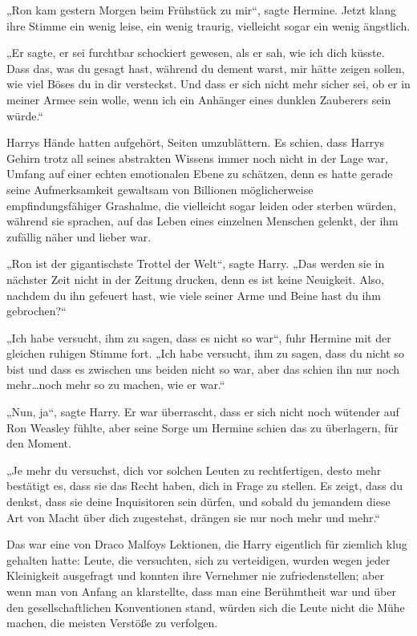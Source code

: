 {„Ron kam gestern Morgen beim Frühstück zu mir“, sagte Hermine. Jetzt klang ihre Stimme ein wenig leise, ein wenig traurig, vielleicht sogar ein wenig ängstlich.

„Er sagte, er sei furchtbar schockiert gewesen, als er sah, wie ich dich küsste. Dass das, was du gesagt hast, während du dement warst, mir hätte zeigen sollen, wie viel Böses du in dir versteckst. Und dass er sich nicht mehr sicher sei, ob er in meiner Armee sein wolle, wenn ich ein Anhänger eines dunklen Zauberers sein würde.“

Harrys Hände hatten aufgehört, Seiten umzublättern. Es schien, dass Harrys Gehirn trotz all seines abstrakten Wissens immer noch nicht in der Lage war, Umfang auf einer echten emotionalen Ebene zu schätzen, denn es hatte gerade seine Aufmerksamkeit gewaltsam von Billionen möglicherweise empfindungsfähiger Grashalme, die vielleicht sogar leiden oder sterben würden, während sie sprachen, auf das Leben eines einzelnen Menschen gelenkt, der ihm zufällig näher und lieber war.

„Ron ist der gigantischste Trottel der Welt“, sagte Harry. „Das werden sie in nächster Zeit nicht in der Zeitung drucken, denn es ist keine Neuigkeit. Also, nachdem du ihn gefeuert hast, wie viele seiner Arme und Beine hast du ihm gebrochen?“

„Ich habe versucht, ihm zu sagen, dass es nicht so war“, fuhr Hermine mit der gleichen ruhigen Stimme fort. „Ich habe versucht, ihm zu sagen, dass du nicht so bist und dass es zwischen uns beiden nicht so war, aber das schien ihn nur noch mehr…noch mehr so zu machen, wie er war.“

„Nun, ja“, sagte Harry. Er war überrascht, dass er sich nicht noch wütender auf Ron Weasley fühlte, aber seine Sorge um Hermine schien das zu überlagern, für den Moment.

„Je mehr du versuchst, dich vor solchen Leuten zu rechtfertigen, desto mehr bestätigt es, dass sie das Recht haben, dich in Frage zu stellen. Es zeigt, dass du denkst, dass sie deine Inquisitoren sein dürfen, und sobald du jemandem diese Art von Macht über dich zugestehst, drängen sie nur noch mehr und mehr.“

Das war eine von Draco Malfoys Lektionen, die Harry eigentlich für ziemlich klug gehalten hatte: Leute, die versuchten, sich zu verteidigen, wurden wegen jeder Kleinigkeit ausgefragt und konnten ihre Vernehmer nie zufriedenstellen; aber wenn man von Anfang an klarstellte, dass man eine Berühmtheit war und über den gesellschaftlichen Konventionen stand, würden sich die Leute nicht die Mühe machen, die meisten Verstöße zu verfolgen.

}
